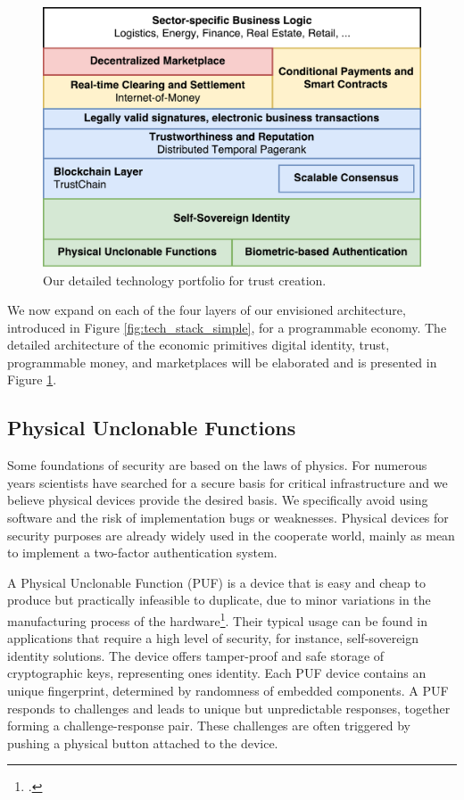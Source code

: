 \documentclass[USenglish]{article}
\begin{document}
\begin{figure}[t]
	\centering
	\includegraphics[width=1\columnwidth]{assets/tech_stack}
	\caption{Our detailed technology portfolio for trust creation.}
	\label{fig:tech_stack}
\end{figure}

We now expand on each of the four layers of our envisioned architecture, introduced in Figure \ref{fig:tech_stack_simple}, for a programmable economy.
The detailed architecture of the economic primitives digital identity, trust, programmable money, and marketplaces will be elaborated and is presented in Figure \ref{fig:tech_stack}.

\subsection{Physical Unclonable Functions}
\label{sec:pufs}
Some foundations of security are based on the laws of physics.
For numerous years scientists have searched for a secure basis for critical infrastructure and we believe physical devices provide the desired basis.
We specifically avoid using software and the risk of implementation bugs or weaknesses.
Physical devices for security purposes are already widely used in the cooperate world, mainly as mean to implement a two-factor authentication system.

A Physical Unclonable Function (PUF) is a device that is easy and cheap to produce but practically infeasible to duplicate, due to minor variations in the manufacturing process of the hardware\footcite{cortez2012modeling}.
Their typical usage can be found in applications that require a high level of security, for instance, self-sovereign identity solutions.
The device offers tamper-proof and safe storage of cryptographic keys, representing ones identity.
Each PUF device contains an unique fingerprint, determined by randomness of embedded components.
A PUF responds to challenges and leads to unique but unpredictable responses, together forming a challenge-response pair.
These challenges are often triggered by pushing a physical button attached to the device.
\end{document}
